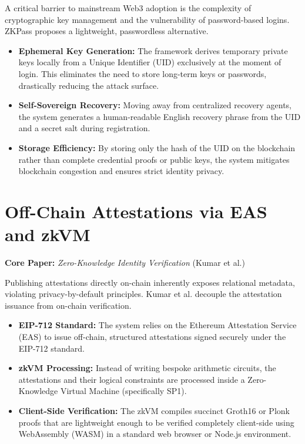 \documentclass[12pt, a4paper]{article}
\begin{document}
A critical barrier to mainstream Web3 adoption is the complexity of cryptographic key management and the vulnerability of password-based logins. ZKPass proposes a lightweight, passwordless alternative.
\begin{itemize}
    \item \textbf{Ephemeral Key Generation:} The framework derives temporary private keys locally from a Unique Identifier (UID) exclusively at the moment of login. This eliminates the need to store long-term keys or passwords, drastically reducing the attack surface.
    \item \textbf{Self-Sovereign Recovery:} Moving away from centralized recovery agents, the system generates a human-readable English recovery phrase from the UID and a secret salt during registration.
    \item \textbf{Storage Efficiency:} By storing only the hash of the UID on the blockchain rather than complete credential proofs or public keys, the system mitigates blockchain congestion and ensures strict identity privacy.
\end{itemize}

\section{Off-Chain Attestations via EAS and zkVM}
\textbf{Core Paper:} \textit{Zero-Knowledge Identity Verification} (Kumar et al.)

Publishing attestations directly on-chain inherently exposes relational metadata, violating privacy-by-default principles. Kumar et al. decouple the attestation issuance from on-chain verification.
\begin{itemize}
    \item \textbf{EIP-712 Standard:} The system relies on the Ethereum Attestation Service (EAS) to issue off-chain, structured attestations signed securely under the EIP-712 standard.
    \item \textbf{zkVM Processing:} Instead of writing bespoke arithmetic circuits, the attestations and their logical constraints are processed inside a Zero-Knowledge Virtual Machine (specifically SP1).
    \item \textbf{Client-Side Verification:} The zkVM compiles succinct Groth16 or Plonk proofs that are lightweight enough to be verified completely client-side using WebAssembly (WASM) in a standard web browser or Node.js environment.
\end{itemize}
\end{document}
